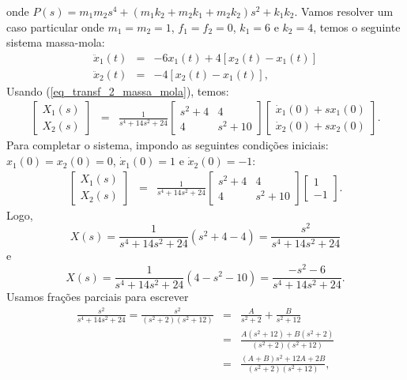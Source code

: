 onde $P(s)=m_1m_2s^4+(m_1k_2+m_2k_1+m_2k_2)s^2+k_1k_2$. Vamos resolver um caso particular onde $m_1=m_2=1$, $f_1=f_2=0$, $k_1=6$ e $k_2=4$, temos o seguinte sistema massa-mola:
\begin{eqnarray*}
  \ddot{x}_1(t) &=&  - 6 x_1(t) + 4\left[x_2(t)-x_1(t)\right]\\
 \ddot{x}_2(t) &=&  - 4\left[x_2(t)-x_1(t)\right],
\end{eqnarray*}
Usando (\ref{eq_transf_2_massa_mola}), temos:
\begin{eqnarray*}
\left[\begin{array}{c}
       X_1(s)\\
       X_2(s)
      \end{array}
\right]
&=&\frac{1}{s^4+14s^2+24}
\left[\begin{array}{cc}
       s^2+4 & 4\\
 4&       s^2+10
      \end{array}
\right]
\left[\begin{array}{c}
\dot{x}_1(0)+sx_1(0)\\  
\dot{x}_2(0)+sx_2(0)
       \end{array}
\right].
\end{eqnarray*}
Para completar o sistema, impondo as seguintes condições iniciais: $x_1(0)=x_2(0)=0$, $\dot{x}_1(0)=1$ e $\dot{x}_2(0)=-1$:
\begin{eqnarray*}
\left[\begin{array}{c}
       X_1(s)\\
       X_2(s)
      \end{array}
\right]
&=&\frac{1}{s^4+14s^2+24}
\left[\begin{array}{cc}
       s^2+4 & 4\\
 4&       s^2+10
      \end{array}
\right]
\left[\begin{array}{c}
1\\  
-1
       \end{array}
\right].
\end{eqnarray*}
Logo,
$$
X(s)=\frac{1}{s^4+14s^2+24}\left(s^2+4-4\right)=\frac{s^2}{s^4+14s^2+24}
$$
e
$$
X(s)=\frac{1}{s^4+14s^2+24}\left(4-s^2-10\right)=\frac{-s^2-6}{s^4+14s^2+24}.
$$
Usamos frações parciais para escrever
\begin{eqnarray*}
\frac{s^2}{s^4+14s^2+24}=\frac{s^2}{(s^2+2)(s^2+12)}&=&\frac{A}{s^2+2}+\frac{B}{s^2+12}\\&=&\frac{A(s^2+12)+B(s^2+2)}{(s^2+2)(s^2+12)}\\
&=&\frac{(A+B)s^2+12A+2B}{(s^2+2)(s^2+12)},
\end{eqnarray*}
